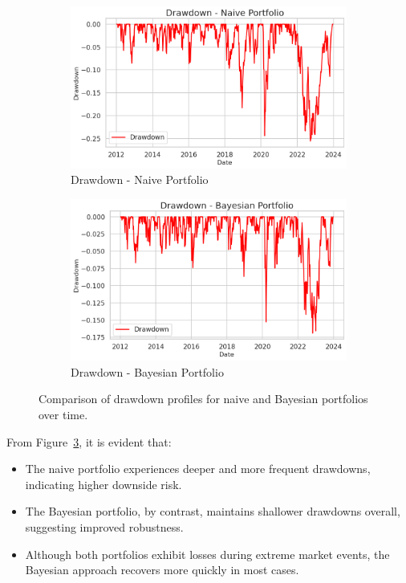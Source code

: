 \documentclass[a4paper,12pt]{article}
\begin{document}
\begin{figure}[H]
    \centering
    \begin{subfigure}[b]{0.45\textwidth}
        \centering
        \includegraphics[width=\textwidth]{figures/Figure5a.png}
        \caption{Drawdown - Naive Portfolio}
        \label{fig:drawdown_naive}
    \end{subfigure}
    \hfill
    \begin{subfigure}[b]{0.45\textwidth}
        \centering
        \includegraphics[width=\textwidth]{figures/Figure5b.png}
        \caption{Drawdown - Bayesian Portfolio}
        \label{fig:drawdown_bayes}
    \end{subfigure}
    \caption{Comparison of drawdown profiles for naive and Bayesian portfolios over time.}
    \label{fig:drawdown_comparison}
\end{figure}

From Figure~\ref{fig:drawdown_comparison}, it is evident that:
\begin{itemize}
    \item The naive portfolio experiences deeper and more frequent drawdowns, indicating higher downside risk.
    \item The Bayesian portfolio, by contrast, maintains shallower drawdowns overall, suggesting improved robustness.
    \item Although both portfolios exhibit losses during extreme market events, the Bayesian approach recovers more quickly in most cases.
\end{itemize}
\end{document}
